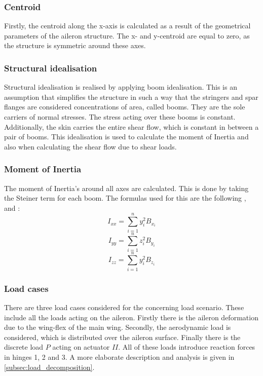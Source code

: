\subsubsection{Centroid}
Firstly, the centroid along the x-axis is calculated as a result of the geometrical parameters of the aileron structure. The x- and y-centroid are equal to zero, as the structure is symmetric around these axes.

\subsubsection{Structural idealisation}
Structural idealisation is realised by applying boom idealisation. This is an assumption that simplifies the structure in such a way that the stringers and spar flanges are considered concentrations of area, called booms. They are the sole carriers of normal stresses. The stress acting over these booms is constant.
Additionally, the skin carries the entire shear flow, which is constant in between a pair of booms.
This idealisation is used to calculate the moment of Inertia and also when calculating the shear flow due to shear loads.

\subsubsection{Moment of Inertia}
The moment of Inertia's around all axes are calculated. This is done by taking the Steiner term for each boom. The formulas used for this are the following ,  and :
\begin{equation}
\label{MoI_xx}
    I_{x x}=\sum_{i=1}^{n} y_{i}^{2} B_{x_{i}}
\end{equation}
\begin{equation}
\label{MoI_yy}
    I_{y y}=\sum_{i=1}^{n} z_{i}^{2} B_{y_{i}}
\end{equation}
\begin{equation}
\label{MoI_zz}
    I_{z z}=\sum_{i=1}^{n} y_{i}^{2} B_{z_{i}}
\end{equation}

\subsubsection{Load cases}

There are three load cases considered for the concerning load scenario. These include all the loads acting on the aileron.
Firstly there is the aileron deformation due to the wing-flex of the main wing. Secondly, the aerodynamic load is considered, which is distributed over the aileron surface. Finally there is the discrete load $P$ acting on actuator $II$. All of these loads introduce reaction forces in hinges 1, 2 and 3. A more elaborate description and analysis is given in \autoref{subsec:load_decomposition}.

